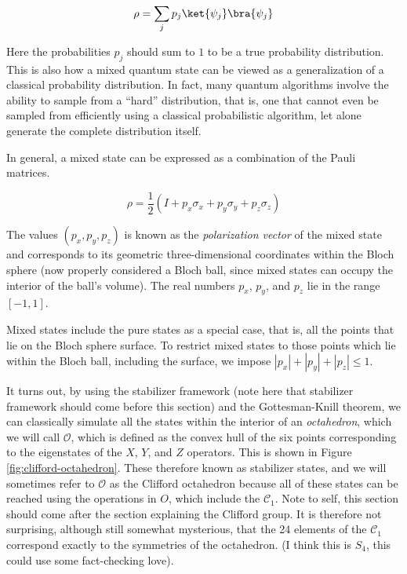 \begin{displaymath}
\rho = \sum_{j} p_j \ket{\psi_j}\bra{\psi_j}
\end{displaymath}

Here the probabilities $p_j$ should sum to $1$ to be a true probability
distribution. This is also how a mixed quantum state can be viewed as a
generalization of a classical probability distribution. In fact, many
quantum algorithms involve the ability to sample from a ``hard'' distribution,
that is, one that cannot even be sampled from efficiently using a classical
probabilistic algorithm, let alone generate the complete distribution itself.

In general, a mixed state can be expressed as a combination of the Pauli
matrices.

\begin{equation}
\rho = \frac{1}{2}(I + p_x\sigma_x + p_y\sigma_y + p_z\sigma_z)
\end{equation}

The values $(p_x, p_y, p_z)$ is known as the \emph{polarization vector} of
the mixed state and corresponds to its geometric three-dimensional coordinates
within the Bloch sphere (now properly considered a Bloch ball, since mixed
states can occupy the interior of the ball's volume). The real numbers
$p_x$, $p_y$, and $p_z$ lie in the range $[-1,1]$.

Mixed states include the pure states as a special case, that is, all the
points that lie on the Bloch sphere surface. To restrict mixed states
to those points which lie within the Bloch ball, including the surface,
we impose $|p_x| + |p_y| + |p_z| \le 1$.



It turns out, by using the stabilizer framework (note here that stabilizer
framework should come before this section) and the Gottesman-Knill theorem,
we can classically simulate all the states within the interior of an
\emph{octahedron}, which we will call $\mathcal{O}$, which is defined as the
convex hull of the six points corresponding to the eigenstates of the
$X$, $Y$, and $Z$ operators.
This is shown in Figure \ref{fig:clifford-octahedron}.
These therefore known as stabilizer states, and we will sometimes refer to
$\mathcal{O}$ as the Clifford octahedron because all of these states can be
reached using the operations in $O$, which include the $\mathcal{C}_1$.
Note to self, this section should come after the section explaining the
Clifford group. It is therefore not surprising, although still somewhat
mysterious, that the 24 elements of the $\mathcal{C}_1$ correspond
exactly to the symmetries of the octahedron. (I think this is $S_4$, this
could use some fact-checking love).

